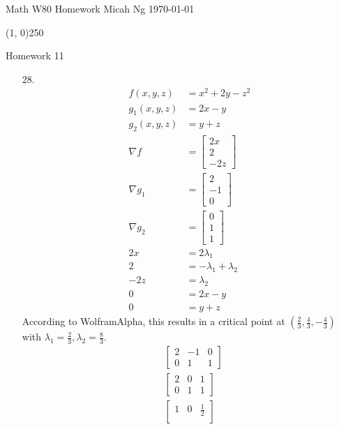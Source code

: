 \documentclass[11pt,letterpaper]{article}
\begin{document}
\noindent
Math W80 Homework \hfill Micah Ng \hfill \today

\begin{center}
\line(1, 0){250}
\end{center}

\noindent
Homework 11

\begin{enumerate}
\item[28.]
  \begin{align*}
    f(x,y,z) &= x^2+2y-z^2 \\
    g_1(x,y,z) &= 2x-y \\
    g_2(x,y,z) &= y+z \\
    \nabla f &= \begin{bmatrix}2x \\ 2 \\ -2z\end{bmatrix} \\
    \nabla g_1 &= \begin{bmatrix}2 \\ -1 \\ 0\end{bmatrix} \\
    \nabla g_2 &= \begin{bmatrix}0 \\ 1 \\ 1\end{bmatrix} \\
    2x &= 2\lambda_1 \\
    2 &= -\lambda_1+\lambda_2 \\
    -2z &= \lambda_2 \\
    0 &= 2x-y \\
    0 &= y+z
  \end{align*}
  According to WolframAlpha, this results in a critical point at
  $\left(\frac{2}{3},\frac{4}{3},-\frac{4}{3}\right)$ with
  $\lambda_1=\frac{2}{3},\lambda_2=\frac{8}{3}$.
  \begin{align*}
    &\begin{bmatrix}
      2 & -1 & 0 \\
      0 & 1 & 1
    \end{bmatrix} \\
    &\begin{bmatrix}
      2 & 0 & 1 \\
      0 & 1 & 1
    \end{bmatrix} \\
    &\begin{bmatrix}
      1 & 0 & \frac{1}{2} \\[0.3em]

\end{bmatrix}
\end{align*}
\end{enumerate}
\end{document}
